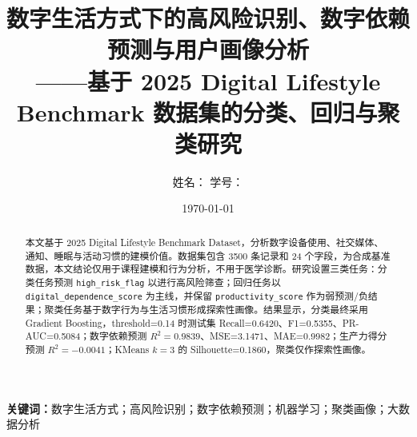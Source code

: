 \documentclass[UTF8,a4paper,12pt]{ctexart}
\title{数字生活方式下的高风险识别、数字依赖预测与用户画像分析\\
\large ——基于 2025 Digital Lifestyle Benchmark 数据集的分类、回归与聚类研究}
\author{姓名：\underline{\hspace{4cm}} \quad 学号：\underline{\hspace{4cm}}}
\date{\today}
\begin{document}


\begin{abstract}
本文基于 2025 Digital Lifestyle Benchmark Dataset，分析数字设备使用、社交媒体、通知、睡眠与活动习惯的建模价值。数据集包含 3500 条记录和 24 个字段，为合成基准数据，本文结论仅用于课程建模和行为分析，不用于医学诊断。研究设置三类任务：分类任务预测 \texttt{high\_risk\_flag} 以进行高风险筛查；回归任务以 \texttt{digital\_dependence\_score} 为主线，并保留 \texttt{productivity\_score} 作为弱预测/负结果；聚类任务基于数字行为与生活习惯形成探索性画像。结果显示，分类最终采用 Gradient Boosting，threshold=0.14 时测试集 Recall=0.6420、F1=0.5355、PR-AUC=0.5084；数字依赖预测 $R^2=0.9839$、MSE=3.1471、MAE=0.9982；生产力得分预测 $R^2=-0.0041$；KMeans $k=3$ 的 Silhouette=0.1860，聚类仅作探索性画像。
\end{abstract}

\noindent\textbf{关键词：}数字生活方式；高风险识别；数字依赖预测；机器学习；聚类画像；大数据分析

\tableofcontents
\newpage











\end{document}
